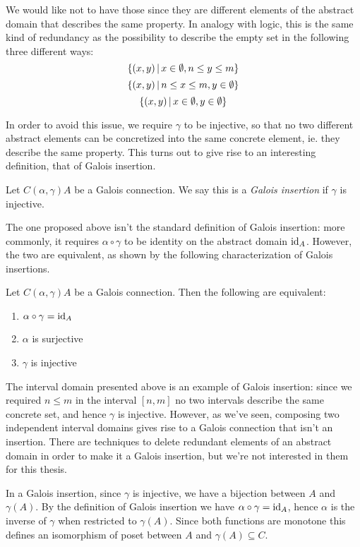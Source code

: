 We would like not to have those since they are different elements of the abstract domain that describes the same property. In analogy with logic, this is the same kind of redundancy as the possibility to describe the empty set in the following three different ways:
\[
\{ (x, y) \,\vert\, x \in \emptyset, n \le y \le m \}
\]
\[
\{ (x, y) \,\vert\, n \le x \le m, y \in \emptyset \}
\]
\[
\{ (x, y) \,\vert\, x \in \emptyset, y \in \emptyset \}
\]

In order to avoid this issue, we require $\gamma$ to be injective, so that no two different abstract elements can be concretized into the same concrete element, ie. they describe the same property. This turns out to give rise to an interesting definition, that of Galois insertion.
\begin{definition}\label{ch2:def:gi}
	Let $C (\alpha, \gamma) A$ be a Galois connection. We say this is a \textit{Galois insertion} if $\gamma$ is injective.
\end{definition}

The one proposed above isn't the standard definition of Galois insertion: more commonly, it requires $\alpha \circ \gamma$ to be identity on the abstract domain $\text{id}_A$. However, the two are equivalent, as shown by the following characterization of Galois insertions.
\begin{prop}\label{ch2:th:gi-charact}
	Let $C (\alpha, \gamma) A$ be a Galois connection. Then the following are equivalent:
	\begin{enumerate}[label={(\arabic*)}]
		\item $\alpha \circ \gamma = \text{id}_A$
		\item $\alpha$ is surjective
		\item $\gamma$ is injective
	\end{enumerate}
\end{prop}

The interval domain presented above is an example of Galois insertion: since we required $n \le m$ in the interval $[n, m]$ no two intervals describe the same concrete set, and hence $\gamma$ is injective. However, as we've seen, composing two independent interval domains gives rise to a Galois connection that isn't an insertion. There are techniques to delete redundant elements of an abstract domain in order to make it a Galois insertion, but we're not interested in them for this thesis.

In a Galois insertion, since $\gamma$ is injective, we have a bijection between $A$ and $\gamma(A)$. By the definition of Galois insertion we have $\alpha \circ \gamma = \text{id}_A$, hence $\alpha$ is the inverse of $\gamma$ when restricted to $\gamma(A)$. Since both functions are monotone this defines an isomorphism of poset between $A$ and $\gamma(A) \subseteq C$.

